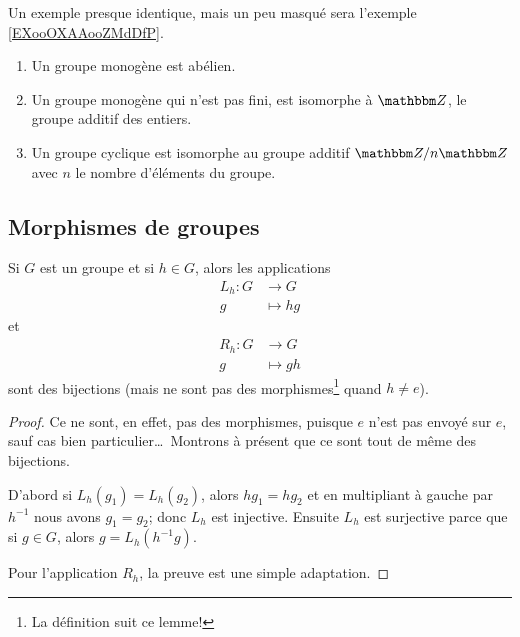 Un exemple presque identique, mais un peu masqué sera l'exemple \ref{EXooOXAAooZMdDfP}.

\begin{proposition}
  \begin{enumerate}
  \item
    Un groupe monogène est abélien.
  \item
    Un groupe monogène qui n'est pas fini, est isomorphe à \( \eZ \), le groupe additif des entiers.
  \item
    Un groupe cyclique est isomorphe au groupe additif \( \eZ / n\eZ \) avec \( n \) le nombre d'éléments du groupe.
  \end{enumerate}
\end{proposition}

\subsection{Morphismes de groupes}
\begin{lemma}       \label{LEMooBIBFooBHxFYC}
    Si \( G\) est un groupe et si \( h\in G\), alors les applications
    \begin{equation}
        \begin{aligned}
            L_h\colon G&\to G \\
            g&\mapsto hg 
        \end{aligned}
    \end{equation}
    et
    \begin{equation}
        \begin{aligned}
            R_h\colon G&\to G \\
            g&\mapsto gh 
        \end{aligned}
    \end{equation}
    sont des bijections (mais ne sont pas des morphismes\footnote{La définition suit ce lemme!} quand \(h \neq e \)).
\end{lemma}

\begin{proof}
    Ce ne sont, en effet, pas des morphismes, puisque \(e \) n'est pas envoyé sur \(e \), sauf cas bien particulier\dots\ Montrons à présent que ce sont tout de même des bijections.

    D'abord si \( L_h(g_1)=L_h(g_2)\), alors \( hg_1=hg_2\) et en multipliant à gauche par \( h^{-1}\) nous avons \( g_1=g_2\); donc \( L_h\) est injective. Ensuite \( L_h\) est surjective parce que si \( g\in G\), alors \( g=L_h(h^{-1} g)\).

    Pour l'application \( R_h\), la preuve est une simple adaptation.
\end{proof}

